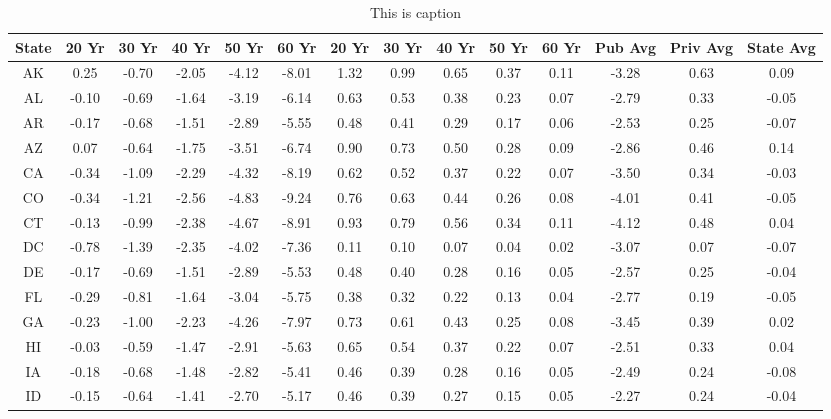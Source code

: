\begin{table}
\centering
\caption{This is caption}
\label{tab:welfare_cola}
\begin{tabular}{cccccccccccccc}
\toprule
State & 20 Yr & 30 Yr & 40 Yr & 50 Yr & 60 Yr & 20 Yr & 30 Yr & 40 Yr & 50 Yr & 60 Yr & Pub Avg & Priv Avg & State Avg \\
\midrule
   AK &  0.25 & -0.70 & -2.05 & -4.12 & -8.01 &  1.32 &  0.99 &  0.65 &  0.37 &  0.11 &   -3.28 &     0.63 &      0.09 \\
   AL & -0.10 & -0.69 & -1.64 & -3.19 & -6.14 &  0.63 &  0.53 &  0.38 &  0.23 &  0.07 &   -2.79 &     0.33 &     -0.05 \\
   AR & -0.17 & -0.68 & -1.51 & -2.89 & -5.55 &  0.48 &  0.41 &  0.29 &  0.17 &  0.06 &   -2.53 &     0.25 &     -0.07 \\
   AZ &  0.07 & -0.64 & -1.75 & -3.51 & -6.74 &  0.90 &  0.73 &  0.50 &  0.28 &  0.09 &   -2.86 &     0.46 &      0.14 \\
   CA & -0.34 & -1.09 & -2.29 & -4.32 & -8.19 &  0.62 &  0.52 &  0.37 &  0.22 &  0.07 &   -3.50 &     0.34 &     -0.03 \\
   CO & -0.34 & -1.21 & -2.56 & -4.83 & -9.24 &  0.76 &  0.63 &  0.44 &  0.26 &  0.08 &   -4.01 &     0.41 &     -0.05 \\
   CT & -0.13 & -0.99 & -2.38 & -4.67 & -8.91 &  0.93 &  0.79 &  0.56 &  0.34 &  0.11 &   -4.12 &     0.48 &      0.04 \\
   DC & -0.78 & -1.39 & -2.35 & -4.02 & -7.36 &  0.11 &  0.10 &  0.07 &  0.04 &  0.02 &   -3.07 &     0.07 &     -0.07 \\
   DE & -0.17 & -0.69 & -1.51 & -2.89 & -5.53 &  0.48 &  0.40 &  0.28 &  0.16 &  0.05 &   -2.57 &     0.25 &     -0.04 \\
   FL & -0.29 & -0.81 & -1.64 & -3.04 & -5.75 &  0.38 &  0.32 &  0.22 &  0.13 &  0.04 &   -2.77 &     0.19 &     -0.05 \\
   GA & -0.23 & -1.00 & -2.23 & -4.26 & -7.97 &  0.73 &  0.61 &  0.43 &  0.25 &  0.08 &   -3.45 &     0.39 &      0.02 \\
   HI & -0.03 & -0.59 & -1.47 & -2.91 & -5.63 &  0.65 &  0.54 &  0.37 &  0.22 &  0.07 &   -2.51 &     0.33 &      0.04 \\
   IA & -0.18 & -0.68 & -1.48 & -2.82 & -5.41 &  0.46 &  0.39 &  0.28 &  0.16 &  0.05 &   -2.49 &     0.24 &     -0.08 \\
   ID & -0.15 & -0.64 & -1.41 & -2.70 & -5.17 &  0.46 &  0.39 &  0.27 &  0.15 &  0.05 &   -2.27 &     0.24 &     -0.04 \\

\end{tabular}
\end{table}
